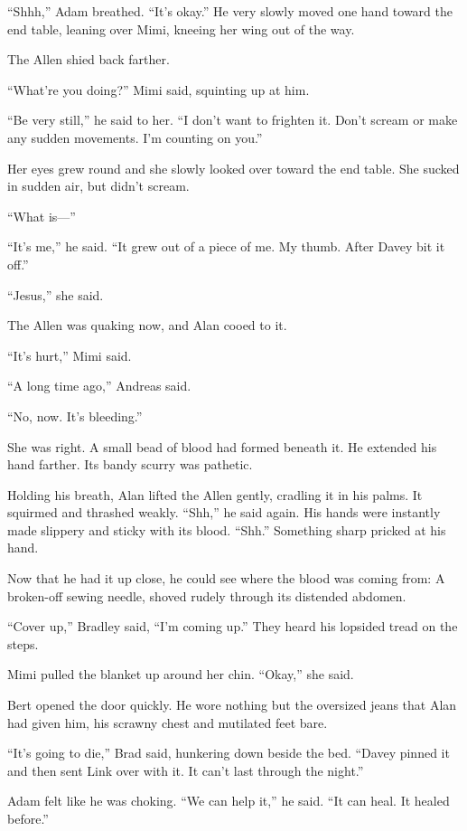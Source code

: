 \documentclass{article}
\begin{document}
``Shhh,'' Adam breathed.  ``It's okay.'' He very slowly moved one hand
toward the end table, leaning over Mimi, kneeing her wing out of the
way. 

The Allen shied back farther. 

``What're you doing?'' Mimi said, squinting up at him.

``Be very still,'' he said to her.  ``I don't want to frighten it. 
Don't scream or make any sudden movements.  I'm counting on you.''

Her eyes grew round and she slowly looked over toward the end table. 
She sucked in sudden air, but didn't scream.

``What is---''

``It's me,'' he said.  ``It grew out of a piece of me.  My thumb. 
After Davey bit it off.''

``Jesus,'' she said.

The Allen was quaking now, and Alan cooed to it. 

``It's hurt,'' Mimi said.

``A long time ago,'' Andreas said.

``No, now.  It's bleeding.''

She was right.  A small bead of blood had formed beneath it.  He
extended his hand farther.  Its bandy scurry was pathetic.

Holding his breath, Alan lifted the Allen gently, cradling it in his
palms.  It squirmed and thrashed weakly.  ``Shh,'' he said again.  His
hands were instantly made slippery and sticky with its blood. 
``Shh.'' Something sharp pricked at his hand.

Now that he had it up close, he could see where the blood was coming
from:  A broken-off sewing needle, shoved rudely through its distended
abdomen.

``Cover up,'' Bradley said, ``I'm coming up.'' They heard his lopsided
tread on the steps.

Mimi pulled the blanket up around her chin.  ``Okay,'' she said.

Bert opened the door quickly.  He wore nothing but the oversized jeans
that Alan had given him, his scrawny chest and mutilated feet bare.

``It's going to die,'' Brad said, hunkering down beside the bed. 
``Davey pinned it and then sent Link over with it.  It can't last
through the night.''

Adam felt like he was choking.  ``We can help it,'' he said.  ``It can
heal.  It healed before.''
\end{document}
